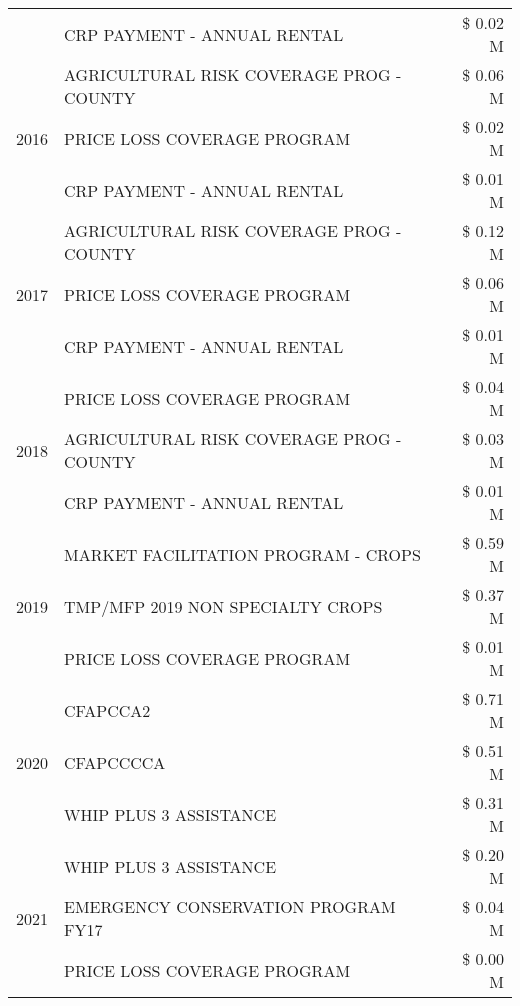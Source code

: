 \begin{tabular}{llr}
 & CRP PAYMENT - ANNUAL RENTAL & \$ 0.02 M \\
\cline{1-3}
\multirow[t]{3}{*}{2016} & AGRICULTURAL RISK COVERAGE PROG - COUNTY & \$ 0.06 M \\
 & PRICE LOSS COVERAGE PROGRAM & \$ 0.02 M \\
 & CRP PAYMENT - ANNUAL RENTAL & \$ 0.01 M \\
\cline{1-3}
\multirow[t]{3}{*}{2017} & AGRICULTURAL RISK COVERAGE PROG - COUNTY & \$ 0.12 M \\
 & PRICE LOSS COVERAGE PROGRAM & \$ 0.06 M \\
 & CRP PAYMENT - ANNUAL RENTAL & \$ 0.01 M \\
\cline{1-3}
\multirow[t]{3}{*}{2018} & PRICE LOSS COVERAGE PROGRAM & \$ 0.04 M \\
 & AGRICULTURAL RISK COVERAGE PROG - COUNTY & \$ 0.03 M \\
 & CRP PAYMENT - ANNUAL RENTAL & \$ 0.01 M \\
\cline{1-3}
\multirow[t]{3}{*}{2019} & MARKET FACILITATION PROGRAM - CROPS & \$ 0.59 M \\
 & TMP/MFP 2019 NON SPECIALTY CROPS & \$ 0.37 M \\
 & PRICE LOSS COVERAGE PROGRAM & \$ 0.01 M \\
\cline{1-3}
\multirow[t]{3}{*}{2020} & CFAPCCA2 & \$ 0.71 M \\
 & CFAPCCCCA & \$ 0.51 M \\
 & WHIP PLUS 3 ASSISTANCE & \$ 0.31 M \\
\cline{1-3}
\multirow[t]{3}{*}{2021} & WHIP PLUS 3 ASSISTANCE & \$ 0.20 M \\
 & EMERGENCY CONSERVATION PROGRAM FY17 & \$ 0.04 M \\
 & PRICE LOSS COVERAGE PROGRAM & \$ 0.00 M \\
\cline{1-3}
\bottomrule
\end{tabular}
